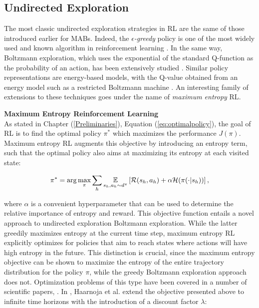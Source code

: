\subsection{Undirected Exploration}
The most classic undirected exploration strategies in \gls{RL} are the same of those introduced earlier for \gls{MAB}s. Indeed, the $\epsilon$\emph{-greedy} policy is one of the most widely used and known algorithm in reinforcement learning \cite{sutton2018reinforcement}. In the same way, Boltzmann exploration, which uses the exponential of the
standard Q-function as the probability of an action, has been extensively studied \cite{thrun1992efficient, cesa2017boltzmann}. Similar policy representations are energy-based models, with
the Q-value obtained from an energy model such as a restricted Boltzmann machine \cite{sallans2004reinforcement}. An interesting family of extensions to these techniques goes under the name of \emph{maximum entropy} \gls{RL}.

\textbf{Maximum Entropy Reinforcement Learning} \\
As stated in Chapter (\ref{Preliminaries}), Equation (\ref{eq:optimalpolicy}), the goal of \gls{RL} is to find the optimal policy $\pi^*$ which maximizes the performance $J(\pi)$. Maximum entropy \gls{RL} augments this objective by introducing an entropy term, such that the optimal policy also aims at maximizing its entropy at each visited state:

\begin{align}
\pi^*=\arg\max_\pi\sum_h\underset{s_h,a_h\sim d^{\pi}}{\mathbb{E}}\left[{\mathcal{R}(s_h,a_h)+\alpha\mathcal{H}(\pi(\cdot|s_h))}\right],
\end{align}

where $\alpha$ is a convenient hyperparameter that can be used to determine the relative importance of entropy and reward. This objective function entails a novel approach to undirected exploration \wrt Boltzmann  exploration. While the latter greedily maximizes entropy at the current time step, maximum entropy \gls{RL} explicitly optimizes for policies that aim to reach states where actions will have high entropy in the future. This distinction is crucial, since the maximum entropy objective can be shown to maximize the entropy of the entire trajectory distribution for the policy $\pi$, while the greedy Boltzmann exploration approach does not. Optimization problems of this type have been covered in a number of scientific papers, \eg \cite{kappen2005path, ziebart2008maximum, haarnoja2017reinforcement}. In \cite{haarnoja2017reinforcement}, Haarnoja et al. extend the objective presented above to infinite time horizons with the introduction of a discount factor $\lambda$:

